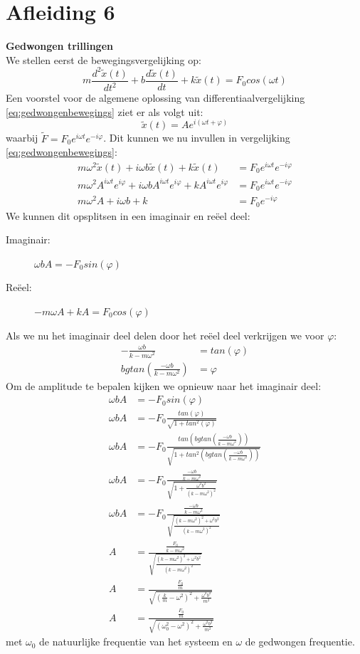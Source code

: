 \documentclass[a4paper,kul]{kulakarticle} %
\begin{document}
\newpage
\section{Afleiding 6}
\textbf{Gedwongen trillingen}\\
We stellen eerst de bewegingsvergelijking op:
\begin{equation}
	m\frac{d^2\widetilde{x}(t)}{dt^2}+b\frac{d\widetilde{x}(t)}{dt}+k\widetilde{x}(t) = F_0cos(\omega t)
	\label{eq:gedwongenbewegings}
\end{equation}
Een voorstel voor de algemene oplossing van differentiaalvergelijking \ref{eq:gedwongenbewegings} ziet er als volgt uit:
\begin{equation*}
	\widetilde{x}(t) = Ae^{i(\omega t +\varphi)}
\end{equation*}
waarbij $\widetilde{F} = F_0e^{i\omega t}e^{-i\varphi}$.
Dit kunnen we nu invullen in vergelijking \ref{eq:gedwongenbewegings}:
\begin{align*}
	m\omega^2\widetilde{x}(t)+i\omega b\widetilde{x}(t)+k\widetilde{x}(t) & =F_0e^{i\omega t}e^{-i\varphi}\\
	m\omega^2A^{i\omega t}e^{i\varphi}+i\omega bA^{i\omega t}e^{i\varphi}+kA^{i\omega t}e^{i\varphi} & =F_0e^{i\omega t}e^{-i\varphi}\\
	m\omega^2A+i\omega b+k & =F_0e^{-i\varphi} 
\end{align*}
We kunnen dit opsplitsen in een imaginair en reëel deel:
\begin{description}
	\item[Imaginair:]$\omega bA = -F_0sin(\varphi)$
	\item[Reëel:] $-m\omega A +kA = F_0cos(\varphi)$
\end{description}
Als we nu het imaginair deel delen door het reëel deel verkrijgen we voor $\varphi$:
\begin{align*}
	-\frac{\omega b}{k-m\omega^2} &= tan(\varphi)\\
	bgtan(\frac{-\omega b}{k-m\omega^2}) & =\varphi
\end{align*}
Om de amplitude te bepalen kijken we opnieuw naar het imaginair deel:
\begin{align*}
	\omega bA &= -F_0sin(\varphi)\\
	\omega bA &= -F_0\frac{tan(\varphi)}{\sqrt{1+tan^2(\varphi)}}\\
	\omega bA &= -F_0\frac{tan(bgtan(\frac{-\omega b}{k-m\omega^2}))}{\sqrt{1+tan^2(bgtan(\frac{-\omega b}{k-m\omega^2}))}}\\
	\omega bA &= -F_0\frac{\frac{-\omega b}{k-m\omega^2}}{\sqrt{1+\frac{\omega^2 b^2}{(k-m\omega^2)^2}}}\\
	\omega bA &= -F_0\frac{\frac{-\omega b}{k-m\omega^2}}{\sqrt{\frac{(k-m\omega^2)^2+\omega^2 b^2}{(k-m\omega^2)^2}}}\\
	A &= \frac{\frac{F_0}{k-m\omega^2}}{\sqrt{\frac{(k-m\omega^2)^2+\omega^2 b^2}{(k-m\omega^2)^2}}}\\
	A &= \frac{\frac{F_0}{m}}{\sqrt{(\frac{k}{m}-\omega^2)^2+\frac{\omega^2b^2}{m^2}}}\\
	A &= \frac{\frac{F_0}{m}}{\sqrt{(\omega_0^2-\omega^2)^2+\frac{\omega^2b^2}{m^2}}}	
\end{align*}
met $\omega_0$ de natuurlijke frequentie van het systeem en $\omega$ de gedwongen frequentie.
\newpage
\end{document}
